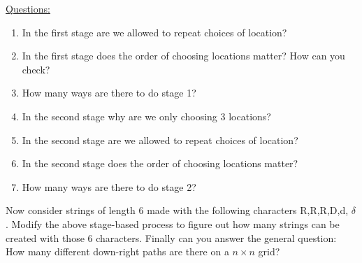 \documentclass[11pt]{amsart}
\begin{document}
\underline{Questions:}
\begin{enumerate}[noitemsep, topsep=0pt, parsep=0pt, partopsep=0pt]
\item In the first stage are we allowed to repeat choices of location?
\item In the first stage does the order of choosing locations matter?  How can you check?
\item How many ways are there to do stage 1?
\item In the second stage why are we only choosing 3 locations?
\item In the second stage are we allowed to repeat choices of location?
\item In the second stage does the order of choosing locations matter?
\item How many ways are there to do stage 2?\\
\end{enumerate}
\vfill
Now consider strings of length 6 made with the following characters R,R,R,D,d, $\delta$.  Modify the above stage-based process to figure out how many strings can be created with those 6 characters.  Finally can you answer the general question:  How many different down-right paths are there on a $n \times n$ grid?
\end{document}
